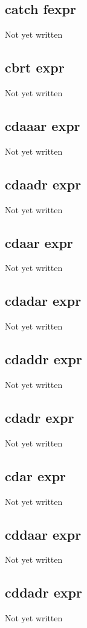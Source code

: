 \documentclass[a4paper,11pt]{article}
\begin{document}
\subsection{\ttfamily catch fexpr}
Not yet written

\subsection{\ttfamily cbrt expr}
Not yet written

\subsection{\ttfamily cdaaar expr}
Not yet written

\subsection{\ttfamily cdaadr expr}
Not yet written

\subsection{\ttfamily cdaar expr}
Not yet written

\subsection{\ttfamily cdadar expr}
Not yet written

\subsection{\ttfamily cdaddr expr}
Not yet written

\subsection{\ttfamily cdadr expr}
Not yet written

\subsection{\ttfamily cdar expr}
Not yet written

\subsection{\ttfamily cddaar expr}
Not yet written

\subsection{\ttfamily cddadr expr}
Not yet written
\end{document}
